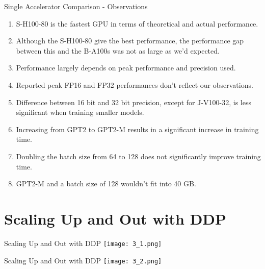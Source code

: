 \documentclass[t]{beamer}
\begin{document}
\begin{frame}{Single Accelerator Comparison - Observations}

\begin{enumerate}
  \item S-H100-80 is the fastest GPU in terms of theoretical and actual performance.
  \item Although the S-H100-80 give the best performance, the performance gap between this and the B-A100s was not as large as we'd expected. 
  \item Performance largely depends on peak performance and precision used.
  \item Reported peak FP16 and FP32 performances don't reflect our observations.
  \item Difference between 16 bit and 32 bit precision, except for J-V100-32, is less significant when training smaller models.
  \item Increasing from GPT2 to GPT2-M results in a significant increase in training time.
  \item Doubling the batch size from 64 to 128 does not significantly improve training time.
  \item GPT2-M and a batch size of 128 wouldn't fit into 40 GB.
\end{enumerate}

\end{frame}

\section{Scaling Up and Out with DDP}

\begin{frame}{Scaling Up and Out with DDP}
\texttt{[image: 3\_1.png]}
\end{frame}

\begin{frame}{Scaling Up and Out with DDP}
\texttt{[image: 3\_2.png]}
\end{frame}
\end{document}
